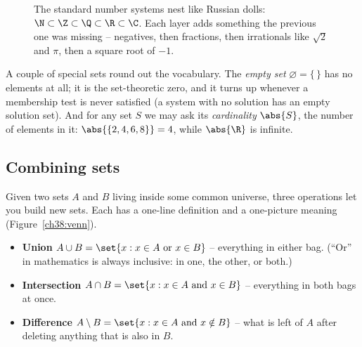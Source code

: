 \begin{figure}[H]
\centering
{}
\caption{The standard number systems nest like Russian dolls:
$\N \subset \Z \subset \Q \subset \R \subset \C$. Each layer adds something the previous
one was missing -- negatives, then fractions, then irrationals like $\sqrt 2$ and $\pi$,
then a square root of $-1$.}
\label{ch38:numbernest}
\end{figure}

A couple of special sets round out the vocabulary. The \emph{empty set} $\varnothing =
\{\,\}$ has no elements at all; it is the set-theoretic zero, and it turns up whenever a
membership test is never satisfied (a system with no solution has an empty solution set).
And for any set $S$ we may ask its \emph{cardinality} $\abs{S}$, the number of elements in
it: $\abs{\{2,4,6,8\}} = 4$, while $\abs{\R}$ is infinite.

\subsection{Combining sets}

Given two sets $A$ and $B$ living inside some common universe, three operations let you
build new sets. Each has a one-line definition and a one-picture meaning
(Figure~\ref{ch38:venn}).

\begin{itemize}
  \item \textbf{Union} $A \cup B = \set{x : x \in A \text{ or } x \in B}$ -- everything in
        either bag. (``Or'' in mathematics is always inclusive: in one, the other, or
        both.)
  \item \textbf{Intersection} $A \cap B = \set{x : x \in A \text{ and } x \in B}$ --
        everything in both bags at once.
  \item \textbf{Difference} $A \setminus B = \set{x : x \in A \text{ and } x \notin B}$ --
        what is left of $A$ after deleting anything that is also in $B$.
\end{itemize}

